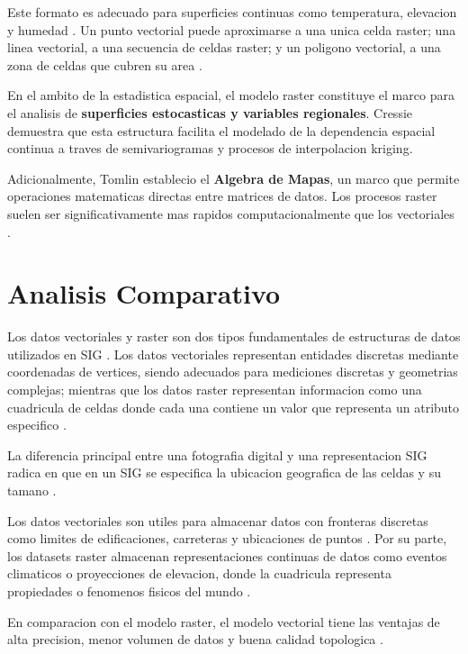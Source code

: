 \documentclass[11pt,a4paper]{article}
\begin{document}
Este formato es adecuado para superficies continuas como temperatura, elevacion y humedad \cite{bajjali2017working}. Un punto vectorial puede aproximarse a una unica celda raster; una linea vectorial, a una secuencia de celdas raster; y un poligono vectorial, a una zona de celdas que cubren su area \cite{bajjali2017working}.

En el ambito de la estadistica espacial, el modelo raster constituye el marco para el analisis de \textbf{superficies estocasticas y variables regionales}. Cressie \cite{cressie1993statistics} demuestra que esta estructura facilita el modelado de la dependencia espacial continua a traves de semivariogramas y procesos de interpolacion kriging.

Adicionalmente, Tomlin \cite{tomlin1990geographic} establecio el \textbf{Algebra de Mapas}, un marco que permite operaciones matematicas directas entre matrices de datos. Los procesos raster suelen ser significativamente mas rapidos computacionalmente que los vectoriales \cite{bajjali2017working}.

\section{Analisis Comparativo}

Los datos vectoriales y raster son dos tipos fundamentales de estructuras de datos utilizados en SIG \cite{maesen2024introduction}. Los datos vectoriales representan entidades discretas mediante coordenadas de vertices, siendo adecuados para mediciones discretas y geometrias complejas; mientras que los datos raster representan informacion como una cuadricula de celdas donde cada una contiene un valor que representa un atributo especifico \cite{maesen2024introduction}.

La diferencia principal entre una fotografia digital y una representacion SIG radica en que en un SIG se especifica la ubicacion geografica de las celdas y su tamano \cite{giofandi2023comparison}.

Los datos vectoriales son utiles para almacenar datos con fronteras discretas como limites de edificaciones, carreteras y ubicaciones de puntos \cite{giofandi2023comparison}. Por su parte, los datasets raster almacenan representaciones continuas de datos como eventos climaticos o proyecciones de elevacion, donde la cuadricula representa propiedades o fenomenos fisicos del mundo \cite{giofandi2023comparison}.

En comparacion con el modelo raster, el modelo vectorial tiene las ventajas de alta precision, menor volumen de datos y buena calidad topologica \cite{yao2018big}.
\end{document}
